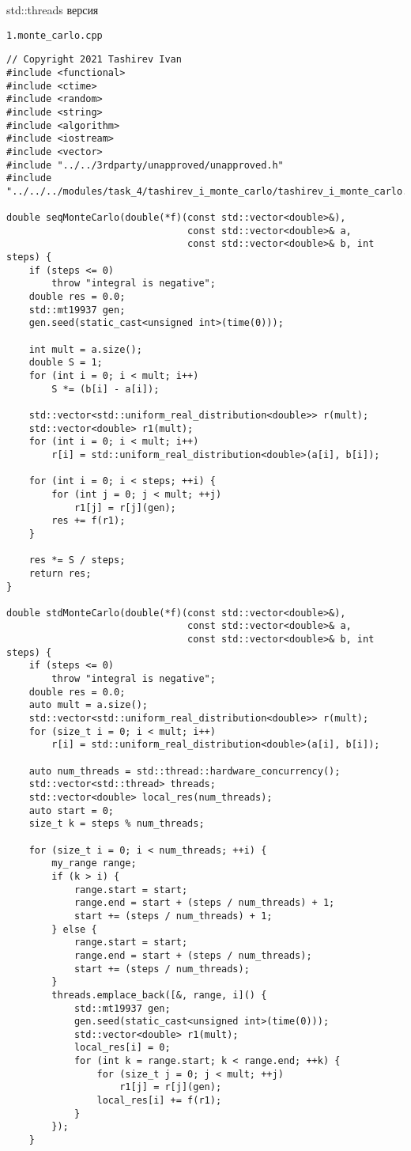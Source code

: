 \documentclass{report}
\begin{document}
\par std::threads версия
\par \verb|1.monte_carlo.cpp|
\begin{lstlisting}
// Copyright 2021 Tashirev Ivan
#include <functional>
#include <ctime>
#include <random>
#include <string>
#include <algorithm>
#include <iostream>
#include <vector>
#include "../../3rdparty/unapproved/unapproved.h"
#include "../../../modules/task_4/tashirev_i_monte_carlo/tashirev_i_monte_carlo.h"

double seqMonteCarlo(double(*f)(const std::vector<double>&),
                                const std::vector<double>& a,
                                const std::vector<double>& b, int steps) {
    if (steps <= 0)
        throw "integral is negative";
    double res = 0.0;
    std::mt19937 gen;
    gen.seed(static_cast<unsigned int>(time(0)));

    int mult = a.size();
    double S = 1;
    for (int i = 0; i < mult; i++)
        S *= (b[i] - a[i]);

    std::vector<std::uniform_real_distribution<double>> r(mult);
    std::vector<double> r1(mult);
    for (int i = 0; i < mult; i++)
        r[i] = std::uniform_real_distribution<double>(a[i], b[i]);

    for (int i = 0; i < steps; ++i) {
        for (int j = 0; j < mult; ++j)
            r1[j] = r[j](gen);
        res += f(r1);
    }

    res *= S / steps;
    return res;
}

double stdMonteCarlo(double(*f)(const std::vector<double>&),
                                const std::vector<double>& a,
                                const std::vector<double>& b, int steps) {
    if (steps <= 0)
        throw "integral is negative";
    double res = 0.0;
    auto mult = a.size();
    std::vector<std::uniform_real_distribution<double>> r(mult);
    for (size_t i = 0; i < mult; i++)
        r[i] = std::uniform_real_distribution<double>(a[i], b[i]);

    auto num_threads = std::thread::hardware_concurrency();
    std::vector<std::thread> threads;
    std::vector<double> local_res(num_threads);
    auto start = 0;
    size_t k = steps % num_threads;

    for (size_t i = 0; i < num_threads; ++i) {
        my_range range;
        if (k > i) {
            range.start = start;
            range.end = start + (steps / num_threads) + 1;
            start += (steps / num_threads) + 1;
        } else {
            range.start = start;
            range.end = start + (steps / num_threads);
            start += (steps / num_threads);
        }
        threads.emplace_back([&, range, i]() {
            std::mt19937 gen;
            gen.seed(static_cast<unsigned int>(time(0)));
            std::vector<double> r1(mult);
            local_res[i] = 0;
            for (int k = range.start; k < range.end; ++k) {
                for (size_t j = 0; j < mult; ++j)
                    r1[j] = r[j](gen);
                local_res[i] += f(r1);
            }
        });
    }


\end{lstlisting}
\end{document}
